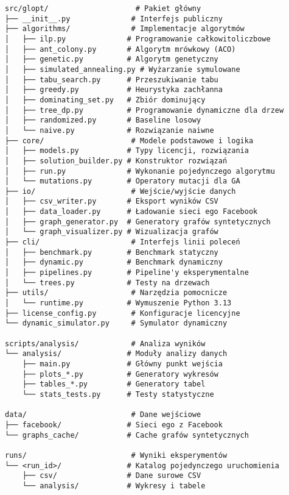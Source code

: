 \begin{verbatim}
src/glopt/                    # Pakiet główny
├── __init__.py              # Interfejs publiczny
├── algorithms/              # Implementacje algorytmów
│   ├── ilp.py              # Programowanie całkowitoliczbowe
│   ├── ant_colony.py       # Algorytm mrówkowy (ACO)
│   ├── genetic.py          # Algorytm genetyczny
│   ├── simulated_annealing.py # Wyżarzanie symulowane
│   ├── tabu_search.py      # Przeszukiwanie tabu
│   ├── greedy.py           # Heurystyka zachłanna
│   ├── dominating_set.py   # Zbiór dominujący
│   ├── tree_dp.py          # Programowanie dynamiczne dla drzew
│   ├── randomized.py       # Baseline losowy
│   └── naive.py            # Rozwiązanie naiwne
├── core/                    # Modele podstawowe i logika
│   ├── models.py           # Typy licencji, rozwiązania
│   ├── solution_builder.py # Konstruktor rozwiązań
│   ├── run.py              # Wykonanie pojedynczego algorytmu
│   └── mutations.py        # Operatory mutacji dla GA
├── io/                      # Wejście/wyjście danych
│   ├── csv_writer.py       # Eksport wyników CSV
│   ├── data_loader.py      # Ładowanie sieci ego Facebook
│   ├── graph_generator.py  # Generatory grafów syntetycznych
│   └── graph_visualizer.py # Wizualizacja grafów
├── cli/                     # Interfejs linii poleceń
│   ├── benchmark.py        # Benchmark statyczny
│   ├── dynamic.py          # Benchmark dynamiczny
│   ├── pipelines.py        # Pipeline'y eksperymentalne
│   └── trees.py            # Testy na drzewach
├── utils/                   # Narzędzia pomocnicze
│   └── runtime.py          # Wymuszenie Python 3.13
├── license_config.py        # Konfiguracje licencyjne
└── dynamic_simulator.py     # Symulator dynamiczny

scripts/analysis/            # Analiza wyników
└── analysis/               # Moduły analizy danych
    ├── main.py             # Główny punkt wejścia
    ├── plots_*.py          # Generatory wykresów
    ├── tables_*.py         # Generatory tabel
    └── stats_tests.py      # Testy statystyczne

data/                        # Dane wejściowe
├── facebook/               # Sieci ego z Facebook
└── graphs_cache/           # Cache grafów syntetycznych

runs/                        # Wyniki eksperymentów
└── <run_id>/               # Katalog pojedynczego uruchomienia
    ├── csv/                # Dane surowe CSV
    └── analysis/           # Wykresy i tabele
\end{verbatim}


